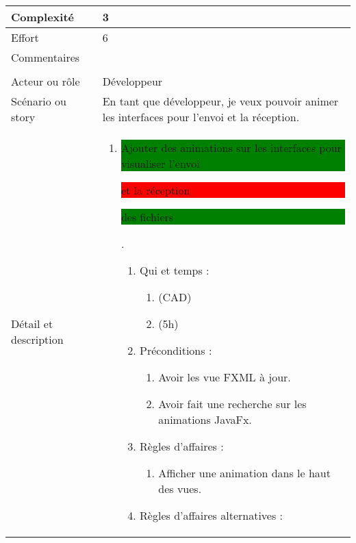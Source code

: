 \begin{longtable}{|l|p{}|}
\hline
    Complexité & 3 \\
\hline
    Effort & 6 \\
\hline
    Commentaires & \\

\hline
    \rowcolor{Gray}
    \multicolumn{2}{|l|}{3} \\
\hline
    Acteur ou rôle & Développeur \\
\hline
    Scénario ou story & En tant que développeur, je veux pouvoir animer les interfaces pour l'envoi et la réception. \\
\hline
    Détail et description &
        \begin{enumerate}[label*=\arabic*.]
            \item \colorbox{Green}{\parbox{10cm}{  Ajouter des animations sur les interfaces pour visualiser l'envoi}}\colorbox{Red}{\parbox{3cm}{ et la réception }} \colorbox{Green}{\parbox{5cm}{ des fichiers}}.
                \begin{enumerate}[label*=\arabic*.]
                                \item Qui et temps :
                                \begin{enumerate}[label*=\arabic*.]
                                    \item (CAD)
                                    \item (5h)
                                \end{enumerate}
                                \item Préconditions :
                                \begin{enumerate}[label*=\arabic*.]
                                    \item Avoir les vue FXML à jour.
                                    \item Avoir fait une recherche sur les animations JavaFx.
                                \end{enumerate}
                                \item Règles d'affaires :
                                \begin{enumerate}[label*=\arabic*.]
                                    \item Afficher une animation dans le haut des vues.
                                \end{enumerate}
                                \item Règles d'affaires alternatives :
                                \begin{enumerate}[label*=\arabic*.]

\end{enumerate}
\end{enumerate}
\end{enumerate}
\end{longtable}
